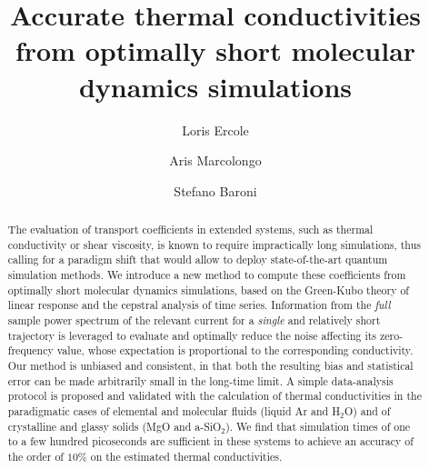 
\title{Accurate thermal conductivities from optimally short molecular dynamics simulations}

\author[1]{Loris Ercole}
\author[2]{Aris Marcolongo}
\author[1,*]{Stefano Baroni}

\begin{abstract}
The evaluation of transport coefficients in extended systems, such as thermal conductivity or shear viscosity, is known to require impractically long simulations, thus calling for a paradigm shift that would allow to deploy state-of-the-art quantum simulation methods. We introduce a new method to compute these coefficients from optimally short molecular dynamics simulations, based on the Green-Kubo theory of linear response and the cepstral analysis of time series. Information from the \emph{full} sample power spectrum of the relevant current for a \emph{single} and relatively short trajectory is leveraged to evaluate and optimally reduce the noise affecting its zero-frequency value, whose expectation is proportional to the corresponding conductivity. Our method is unbiased and consistent, in that both the resulting bias and statistical error can be made arbitrarily small in the long-time limit. A simple data-analysis protocol is proposed and validated with the calculation of thermal conductivities in the paradigmatic cases of elemental and molecular fluids (liquid Ar and H$_2$O) and of crystalline and glassy solids (MgO and a-SiO$_2$). We find that simulation times of one to a few hundred picoseconds are sufficient in these systems to achieve an accuracy of the order of $10\%$ on the estimated thermal conductivities.
\end{abstract}


\flushbottom
\maketitle

